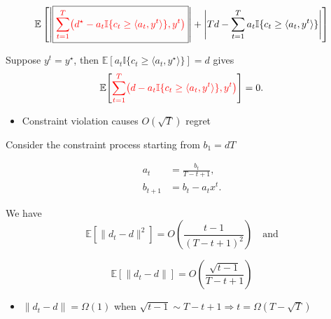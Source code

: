 \documentclass[11pt]{article}
\begin{document}
\vspace*{0.7em}

\[
\mathbb{E}\left[
\left|
\boxed{\color{red}
\sum_{t=1}^{T}\bigl(d^\star-a_t\mathbb{I}\{c_t\geq \langle a_t,y^t\rangle\},y^t\bigr)}
\right|
+
\left|
Td-\sum_{t=1}^{T}a_t\mathbb{I}\{c_t\geq \langle a_t,y^t\rangle\}
\right|
\right]
\]

Suppose \(y^t=y^\star\), then
\(\mathbb{E}[a_t\mathbb{I}\{c_t\geq \langle a_t,y^\star\rangle\}]=d\)
gives
\[
\mathbb{E}\!\left[
{\color{red}\sum_{t=1}^{T}
\bigl(d-a_t\mathbb{I}\{c_t\geq \langle a_t,y^t\rangle\},y^t\bigr)}
\right]=0.
\]

\begin{itemize}
\item[\textcolor{magenta}{\(\bullet\)}]
Constraint violation causes \(O(\sqrt{T})\) regret
\end{itemize}

Consider the constraint process starting from \(b_1=dT\)

\[
\begin{aligned}
a_t &= \frac{b_t}{T-t+1},\\
b_{t+1} &= b_t-a_tx^t .
\end{aligned}
\]

We have
\[
\mathbb{E}[\|d_t-d\|^2]
=O\!\left(\frac{t-1}{(T-t+1)^2}\right)
\quad\text{and}
\]

\[
\mathbb{E}[\|d_t-d\|]
=O\!\left(\frac{\sqrt{t-1}}{T-t+1}\right)
\]

\begin{itemize}
\item[\textcolor{magenta}{\(\bullet\)}]
\(\|d_t-d\|=\Omega(1)\) when
\(\sqrt{t-1}\sim T-t+1 \Rightarrow t=\Omega(T-\sqrt{T})\)
\end{itemize}
\end{document}
